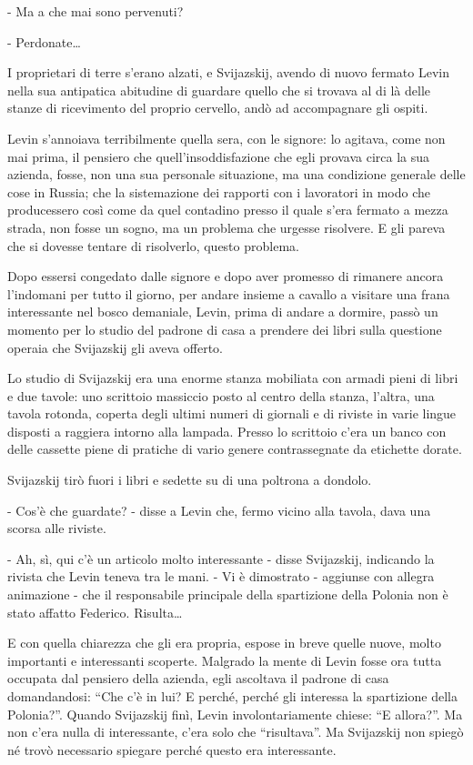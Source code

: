 - Ma a che mai sono pervenuti? 

- Perdonate\ldots{} 
\enlargethispage*{1\baselineskip}

I proprietari di terre s'erano alzati, e Svijazskij, avendo di nuovo fermato Levin nella sua antipatica abitudine di guardare quello che si trovava al di là delle stanze di ricevimento del proprio cervello, andò ad accompagnare gli ospiti. 
\enlargethispage*{1\baselineskip}

\label{xxviii-2} 

Levin s'annoiava terribilmente quella sera, con le signore: lo agitava, come non mai prima, il pensiero che quell'insoddisfazione che egli provava circa la sua azienda, fosse, non una sua personale situazione, ma una condizione generale delle cose in Russia; che la sistemazione dei rapporti con i lavoratori in modo che producessero così come da quel contadino presso il quale s'era fermato a mezza strada, non fosse un sogno, ma un problema che urgesse risolvere. E gli pareva che si dovesse tentare di risolverlo, questo problema. 

Dopo essersi congedato dalle signore e dopo aver promesso di rimanere ancora l'indomani per tutto il giorno, per andare insieme a cavallo a visitare una frana interessante nel bosco demaniale, Levin, prima di andare a dormire, passò un momento per lo studio del padrone di casa a prendere dei libri sulla questione operaia che Svijazskij gli aveva offerto. 

Lo studio di Svijazskij era una enorme stanza mobiliata con armadi pieni di libri e due tavole: uno scrittoio massiccio posto al centro della stanza, l'altra, una tavola rotonda, coperta degli ultimi numeri di giornali e di riviste in varie lingue disposti a raggiera intorno alla lampada. Presso lo scrittoio c'era un banco con delle cassette piene di pratiche di vario genere contrassegnate da etichette dorate. 

Svijazskij tirò fuori i libri e sedette su di una poltrona a dondolo. 

- Cos'è che guardate? - disse a Levin che, fermo vicino alla tavola, dava una scorsa alle riviste. 

- Ah, sì, qui c'è un articolo molto interessante - disse Svijazskij, indicando la rivista che Levin teneva tra le mani. - Vi è dimostrato - aggiunse con allegra animazione - che il responsabile principale della spartizione della Polonia non è stato affatto Federico. Risulta\ldots{} 

E con quella chiarezza che gli era propria, espose in breve quelle nuove, molto importanti e interessanti scoperte. Malgrado la mente di Levin fosse ora tutta occupata dal pensiero della azienda, egli ascoltava il padrone di casa domandandosi: ``Che c'è in lui? E perché, perché gli interessa la spartizione della Polonia?''. Quando Svijazskij finì, Levin involontariamente chiese: ``E allora?''. Ma non c'era nulla di interessante, c'era solo che ``risultava''. Ma Svijazskij non spiegò né trovò necessario spiegare perché questo era interessante. 

